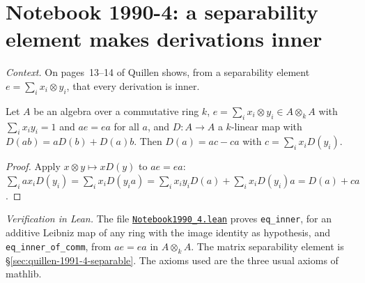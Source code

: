\section[Notebook 1990-4: separability makes derivations inner]{Notebook 1990-4: a separability element makes derivations inner\protect{}}\label{sec:quillen-1990-4}

\emph{Context.} On pages~13--14 of  Quillen shows, from a separability element $e = \sum_ix_i \otimes y_i$, that every derivation is inner.

\begin{encadre}
\begin{theoreme}\label{thm:quillen-1990-4}
Let $A$ be an algebra over a commutative ring $k$, $e = \sum_ix_i\otimes y_i \in A \otimes_k A$ with $\sum_ix_iy_i = 1$ and $ae = ea$ for all $a$, and $D : A \to A$ a $k$-linear map with $D(ab) = aD(b) + D(a)b$. Then $D(a) = ac - ca$ with $c = \sum_ix_iD(y_i)$.
\end{theoreme}
\end{encadre}

\begin{proof}
Apply $x \otimes y \mapsto xD(y)$ to $ae = ea$: $\sum_iax_iD(y_i) = \sum_ix_iD(y_ia) = \sum_ix_iy_iD(a) + \sum_ix_iD(y_i)a = D(a) + ca$.
\end{proof}

\emph{Verification in Lean.} The file \href{\leanblobmain/Notebook1990_4.lean}{\texttt{Notebook1990\_4.\allowbreak{}lean}} proves \texttt{eq\_inner}, for an additive Leibniz map of any ring with the image identity as hypothesis, and \texttt{eq\_inner\_of\_comm}, from $ae = ea$ in $A \otimes_k A$. The matrix separability element is \S\ref{sec:quillen-1991-4-separable}. The axioms used are the three usual axioms of mathlib.

